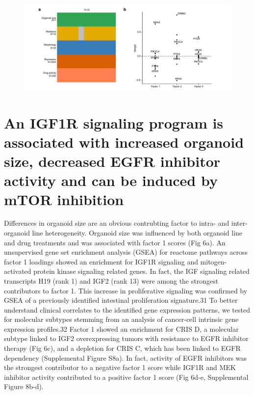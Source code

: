 \begin{flushleft}
\begin{figure}[h]
\centering
\includegraphics[width=\textwidth,
                height=\textheight,
                keepaspectratio]{figures/promise/pdf/fig_4_2.pdf}
\caption{}
\label{fig_242}
\end{figure}
\bigbreak


\section{An IGF1R signaling program is associated with increased organoid size, decreased EGFR inhibitor activity and can be induced by mTOR inhibition}

Differences in organoid size are an obvious contrubting factor to intra- and inter-organoid line heterogeneity. Organoid size was influenced by both organoid line and drug treatments and was associated with factor 1 scores (Fig 6a). An unsupervised gene set enrichment analysis (GSEA) for reactome pathways across factor 1 loadings showed an enrichment for IGF1R signaling and mitogen-activated protein kinase signaling related genes. In fact, the IGF signaling related transcripts H19 (rank 1) and IGF2 (rank 13) were among the strongest contributors to factor 1. This increase in proliferative signaling was confirmed by GSEA of a previously identified intestinal proliferation signature.31 To better understand clinical correlates to the identified gene expression patterns, we tested for molecular subtypes stemming from an analysis of cancer-cell intrinsic gene expression profiles.32 Factor 1 showed an enrichment for CRIS D, a molecular subtype linked to IGF2 overexpressing tumors with resistance to EGFR inhibitor therapy (Fig 6c), and a depletion for CRIS C, which has been linked to EGFR dependency (Supplemental Figure S8a). In fact, activity of EGFR inhibitors was the strongest contributor to a negative factor 1 score while IGF1R and MEK inhibitor activity contributed to a positive factor 1 score (Fig 6d-e, Supplemental Figure 8b-d).


\end{flushleft}
